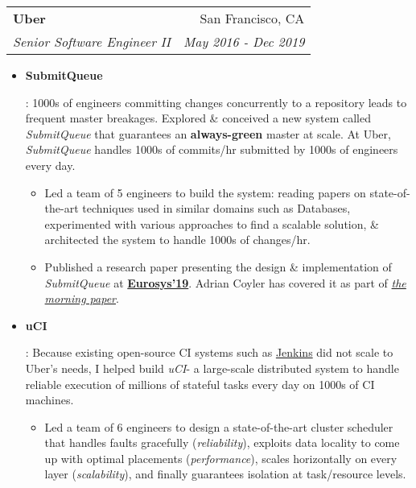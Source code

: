 \documentclass[letterpaper,11pt]{article}
\makeatletter
\newcommand{\resumeItem}[2]{
  \item\small{
    \textbf{#1}{: #2 \vspace{-2pt}}
  }
}
\newcommand{\resumeSubheading}[4]{
  \vspace{-1pt}\item
    \begin{tabular*}{0.97\textwidth}[t]{l@{\extracolsep{\fill}}r}
      \textbf{#1} & #2 \\
      \textit{\small#3} & \textit{\small #4} \\
    \end{tabular*}\vspace{-5pt}
}
\newcommand{\resumeItemListStart}{\begin{itemize}}
\newcommand{\resumeItemListEnd}{\end{itemize}}
\newcommand{\sq}{\textit{SubmitQueue}\xspace}
\newcommand{\uci}{\textit{uCI}\xspace}
\makeatother
\begin{document}
\resumeSubheading
{Uber}{San Francisco, CA}
{Senior Software Engineer II}{May 2016 - Dec 2019}
\resumeItemListStart
\resumeItem{SubmitQueue}
{
  1000s of engineers committing changes concurrently to a repository leads to frequent master breakages.
  Explored \& conceived a new system called \sq that guarantees an \textbf{always-green} master at scale. At Uber, \sq handles 1000s of commits/hr submitted by 1000s of engineers every day.
  \begin{itemize}[label=\textbf{--}]
    \item
          Led a team of 5 engineers to build the system: reading papers on state-of-the-art techniques used in similar domains such as Databases, experimented with various approaches to find a scalable solution, \& architected the system to handle 1000s of changes/hr.
    \item
          Published a research paper presenting the design \& implementation of \sq at \href{https://doi.org/10.1145/3302424.3303970}{\textbf{Eurosys'19}}. Adrian Coyler has covered it as part of \href{https://blog.acolyer.org/2019/04/18/keeping-master-green-at-scale/}{\textit{the morning paper}}.
  \end{itemize}
}
\resumeItem{uCI}
{
  Because existing open-source CI systems such as \href{https://jenkins.io/}{Jenkins} did not scale to Uber's needs, I helped build \uci - a large-scale distributed system to handle reliable execution of millions of stateful tasks every day on 1000s of CI machines.
  \begin{itemize}[label=\textbf{--}]
    \item
          Led a team of 6 engineers to design a state-of-the-art cluster scheduler that handles faults gracefully (\textit{reliability}), exploits data locality to come up with optimal placements (\textit{performance}), scales horizontally on every layer (\textit{scalability}), and finally guarantees isolation at task/resource levels.
  \end{itemize}
}
\resumeItemListEnd
\end{document}
